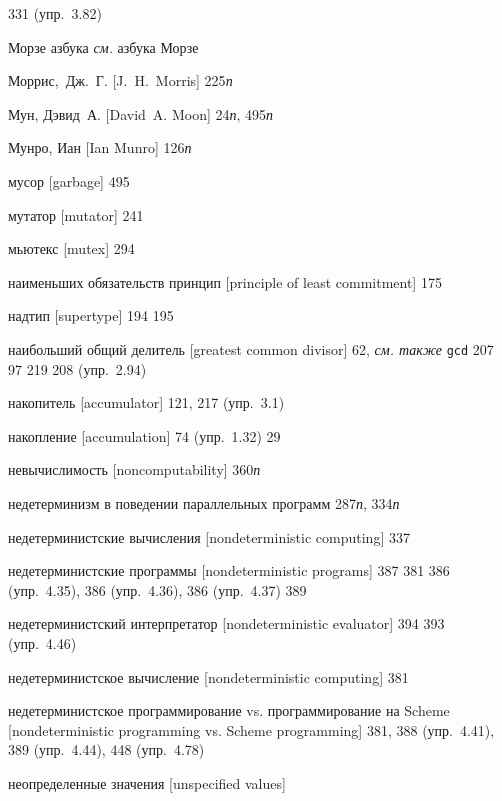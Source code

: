 \begin{theindex}
   331 (упр.~3.82)
\item {Морзе азбука} {\it см.} азбука Морзе
\item {Моррис,~Дж.~Г. [J.~H.~Morris]} 225{\it п}
\item {Мун, Дэвид~А. [David~A. Moon]} 24{\it п}, 495{\it п}
\item {Мунро, Иан [Ian Munro]} 126{\it п}
\item {мусор [garbage]} 495
\item {мутатор [mutator]} 241
\item {мьютекс [mutex]} 294
\bigskip
\item {на\-именьших обязательств принцип [principle of least commitment]} 175
\item {надтип [supertype]} 194
   195
\item {наибольший общий делитель [greatest common divisor]} 62, {\it см. также} \texttt{gcd}
   207
   97
   219
   208 (упр.~2.94)
\item {накопитель [accumulator]} 121, 217 (упр.~3.1)
\item {накопление [accumulation]} 74 (упр.~1.32)
   29
\item {невычислимость [noncomputability]} 360{\it п}
\item {недетерминизм в поведении параллельных программ} 287{\it п}, 334{\it п}
\item {недетерминистские вычисления [non\-de\-ter\-mi\-nis\-tic computing]} 337
\item {недетерминистские программы [nondeterministic programs]}
   387
   381
   386 (упр.~4.35), 386 (упр.~4.36), 386 (упр.~4.37)
   389
\item {недетерминистский интерпретатор [nondeterministic evaluator]} 394
   393 (упр.~4.46)
\item {недетерминистское вычисление [non\-de\-ter\-mi\-nis\-tic computing]} 381
\item {недетерминистское программирование vs. программирование на Scheme [non\-deter\-mi\-nis\-tic programming vs. Scheme programming]} 381, 388 (упр.~4.41), 389 (упр.~4.44), 448 (упр.~4.78)
\item {неопределенные значения [unspecified values]}

\end{theindex}
